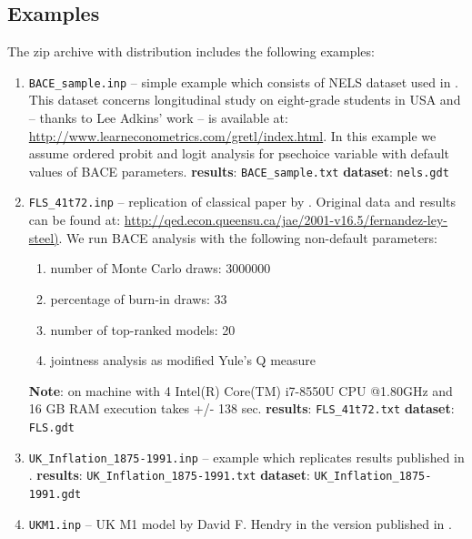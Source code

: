 \subsection{Examples}
The zip archive with  distribution includes
the following examples:
\begin{enumerate}
	\item \texttt{BACE\_sample.inp} -- simple example which
		consists of NELS dataset used in \cite{HillGriffithsLim_principles_2017}.
		This dataset concerns longitudinal study on eight-grade
		students in USA and -- thanks to Lee Adkins' work -- is
		available at: \url{http://www.learneconometrics.com/gretl/index.html}.
		In this example we assume ordered probit and logit analysis
		for psechoice variable with default values of BACE parameters.\newline
		\textbf{results}: \texttt{BACE\_sample.txt}\newline
		\textbf{dataset}: \texttt{nels.gdt}
	\item \texttt{FLS\_41t72.inp} -- replication of classical
		paper by \cite{fernandezleysteel2001b}. Original data
		and results can be found at:
		\url{http://qed.econ.queensu.ca/jae/2001-v16.5/fernandez-ley-steel)}.\newline		
		We run BACE analysis with the following non-default parameters:
		\begin{enumerate}
			\item number of Monte Carlo draws: 3000000
			\item percentage of burn-in draws: 33
			\item number of top-ranked models: 20
			\item jointness analysis as modified Yule's Q measure			
		\end{enumerate}	
		\textbf{Note}: on machine with 4 Intel(R) Core(TM)
		i7-8550U CPU @1.80GHz and 16 GB RAM execution takes
		+/- 138 sec.\newline
		\textbf{results}: \texttt{FLS\_41t72.txt}\newline
		\textbf{dataset}: \texttt{FLS.gdt}
	\item \texttt{UK\_Inflation\_1875-1991.inp} -- example
		which replicates results published in \cite{Kufel_jae_2020}.\newline
		\textbf{results}: \texttt{UK\_Inflation\_1875-1991.txt}\newline
		\textbf{dataset}: \texttt{UK\_Inflation\_1875-1991.gdt}
	\item \texttt{UKM1.inp} -- UK M1 model by David F. Hendry
		in the version published in \cite{KrolzigHendry-Computer_automation-2001}.

\end{enumerate}
